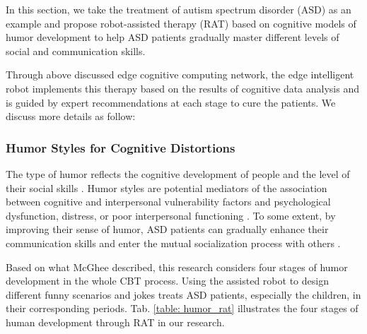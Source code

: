 \documentclass[letterpaper]{article} %
\begin{document}
In this section, we take the treatment of autism spectrum disorder (ASD) as an example and propose robot-assisted therapy (RAT) based on cognitive models of humor development to help ASD patients gradually master different levels of social and communication skills.

Through above discussed edge cognitive computing network, the edge intelligent robot implements this therapy based on the results of cognitive data analysis and is guided by expert recommendations at each stage to cure the patients. We discuss more details as follow:

\subsubsection{Humor Styles for Cognitive Distortions}

The type of humor reflects the cognitive development of people and the level of their social skills \cite{bernet1993humor}. Humor styles are potential mediators of the association between cognitive and interpersonal vulnerability factors and psychological dysfunction, distress, or poor interpersonal functioning \cite{rnic2016cognitive}. To some extent, by improving their sense of humor, ASD patients can gradually enhance their communication skills and enter the mutual socialization process with others \cite{southam2005humor}.

Based on what McGhee \cite{mcghee1979humor} described, this research considers four stages of humor development in the whole CBT process. Using the assisted robot to design different funny scenarios and jokes treats ASD patients, especially the children, in their corresponding periods. Tab. \ref{table: humor_rat} illustrates the four stages of human development through RAT in our research.
\end{document}
